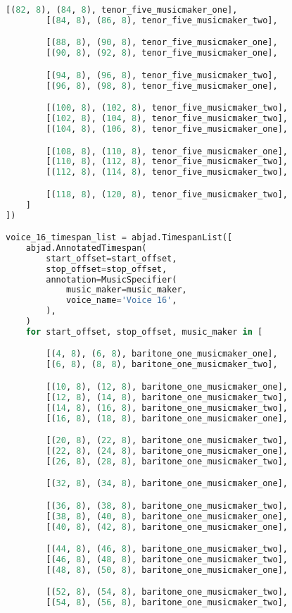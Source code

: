 \begin{lstlisting}[language=Python, caption=Invocation Source Code]
        [(82, 8), (84, 8), tenor_five_musicmaker_one],
        [(84, 8), (86, 8), tenor_five_musicmaker_two],

        [(88, 8), (90, 8), tenor_five_musicmaker_one],
        [(90, 8), (92, 8), tenor_five_musicmaker_one],

        [(94, 8), (96, 8), tenor_five_musicmaker_two],
        [(96, 8), (98, 8), tenor_five_musicmaker_one],

        [(100, 8), (102, 8), tenor_five_musicmaker_two],
        [(102, 8), (104, 8), tenor_five_musicmaker_two],
        [(104, 8), (106, 8), tenor_five_musicmaker_one],

        [(108, 8), (110, 8), tenor_five_musicmaker_one],
        [(110, 8), (112, 8), tenor_five_musicmaker_two],
        [(112, 8), (114, 8), tenor_five_musicmaker_two],

        [(118, 8), (120, 8), tenor_five_musicmaker_two],
    ]
])

voice_16_timespan_list = abjad.TimespanList([
    abjad.AnnotatedTimespan(
        start_offset=start_offset,
        stop_offset=stop_offset,
        annotation=MusicSpecifier(
            music_maker=music_maker,
            voice_name='Voice 16',
        ),
    )
    for start_offset, stop_offset, music_maker in [

        [(4, 8), (6, 8), baritone_one_musicmaker_one],
        [(6, 8), (8, 8), baritone_one_musicmaker_two],

        [(10, 8), (12, 8), baritone_one_musicmaker_one],
        [(12, 8), (14, 8), baritone_one_musicmaker_two],
        [(14, 8), (16, 8), baritone_one_musicmaker_two],
        [(16, 8), (18, 8), baritone_one_musicmaker_one],

        [(20, 8), (22, 8), baritone_one_musicmaker_two],
        [(22, 8), (24, 8), baritone_one_musicmaker_one],
        [(26, 8), (28, 8), baritone_one_musicmaker_two],

        [(32, 8), (34, 8), baritone_one_musicmaker_one],

        [(36, 8), (38, 8), baritone_one_musicmaker_two],
        [(38, 8), (40, 8), baritone_one_musicmaker_one],
        [(40, 8), (42, 8), baritone_one_musicmaker_one],

        [(44, 8), (46, 8), baritone_one_musicmaker_two],
        [(46, 8), (48, 8), baritone_one_musicmaker_two],
        [(48, 8), (50, 8), baritone_one_musicmaker_one],

        [(52, 8), (54, 8), baritone_one_musicmaker_two],
        [(54, 8), (56, 8), baritone_one_musicmaker_two],


\end{lstlisting}
